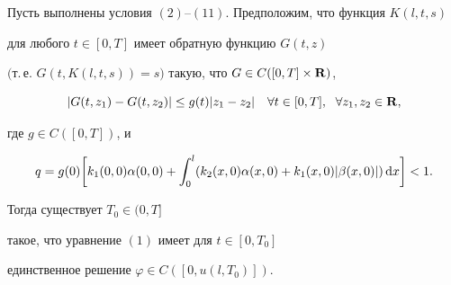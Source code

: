 \begin{thm}


Пусть выполнены условия $(2)$--$(11)$. Предположим, что функция $K(l,t,s)$


для любого $t\in [0,T]$ имеет обратную функцию $G(t,z)$


$($т.\,е. $G(t,K(l,t,s))=s)$ такую, что $G\in C([0,T]\times {\bold R})$,


\begin{equation}


| G(t,z_1)-G(t,z_2)| \leq g(t)| z_1-z_2|


\q\forall t\in [ 0,T],\ \;\forall z_1,z_2\in \rsp,




\end{equation}


где $g\in C([0,T])$, и


\begin{equation}


q = g(0)\bigg[ k_1(0,0)\alpha (0,0)+\int_0^l( k_2(x,0)\alpha


(x,0) +


k_1(x,0)| \beta (x,0)| ) \d x\bigg] <1.




\end{equation}


Тогда существует $T_0\in (0,T]$


такое, что уравнение $(1)$ имеет для $t\in[0,T_0]$


единственное решение $\varphi \in C([0,u(l,T_0)])$.


\end{thm}





